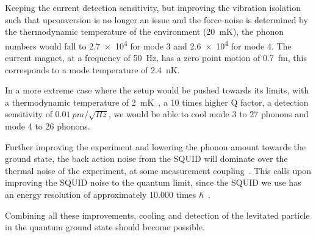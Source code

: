 Keeping the current detection sensitivity, but improving the vibration isolation such that upconversion is no longer an issue and the force noise is determined by the thermodynamic temperature of the environment (\SI{20}{mK}), the phonon numbers would fall to \SI{2.7e4}{} for mode 3 and \SI{2.6e4}{} for mode 4. The current magnet, at a frequency of \SI{50}{Hz}, has a zero point motion of \SI{0.7}{fm}, this corresponds to a mode temperature of \SI{2.4}{nK}.

In a more extreme case where the setup would be pushed towards its limits, with a thermodynamic temperature of \SI{2}{mK}~\cite{Loek, DeWitVibIso}, a 10 times higher Q factor, a detection sensitivity of $\SI{0.01}{pm/\sqrt{Hz}}$, we would be able to cool mode 3 to \SI{27}{} phonons and mode 4 to \SI{26}{} phonons.

Further improving the experiment and lowering the phonon amount towards the ground state, the back action noise from the SQUID will dominate over the thermal noise of the experiment, at some measurement coupling~\cite{ULDM}. This calls upon improving the SQUID noise to the quantum limit, since the SQUID we use has an energy resolution of approximately 10.000 times $\hbar$~\cite{ULDM, Ahrens2025, Vinante2021}.

Combining all these improvements, cooling and detection of the levitated particle in the quantum ground state should become possible.


